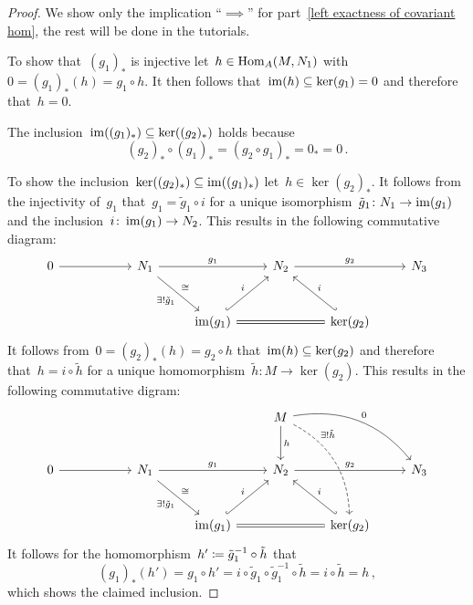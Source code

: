 \begin{proof}
  We show only the implication \enquote{$\implies$} for part~\ref*{left exactness of covariant hom}, the rest will be done in the tutorials.
  
  To show that~$(g_1)_*$ is injective let~$h \in \operatorname{Hom}_A(M,N_1)$ with~$0 = (g_1)_*(h) = g_1 \circ h$.
  It then follows that~$\operatorname{im}(h) \subseteq \ker(g_1) = 0$ and therefore that~$h = 0$.
  
  The inclusion~$\operatorname{im}((g_1)_*) \subseteq \ker((g_2)_*)$ holds because
  \[
      (g_2)_* \circ (g_1)_*
    = (g_2 \circ g_1)_*
    = 0_*
    = 0 \,.
  \]
  
  To show the inclusion~$\ker((g_2)_*) \subseteq \operatorname{im}((g_1)_*)$ let~$h \in \ker(g_2)_*$.
  It follows from the injectivity of~$g_1$ that~$g_1 = \tilde{g}_1 \circ i$ for a unique isomorphism~$\tilde{g}_1 \colon N_1 \to \operatorname{im}(g_1)$ and the inclusion~$i \colon \operatorname{im}(g_1) \to N_2$.
  This results in the following commutative diagram:
  \[
    \begin{tikzcd}[row sep = large]
        0
        \arrow{rr}
      & {}
      & N_1
        \arrow{rr}[above]{g_1}
        \arrow{dr}[below left]{\exists! \tilde{g}_1}[above right]{\cong}
      & {}
      & N_2
        \arrow{rr}[above]{g_2}
      & {}
      & N_3
      \\
        {}
      & {}
      & {}
      & \im(g_1)
        \arrow[hook]{ur}[above left]{i}
        \arrow[equal]{rr}
      & {}
      & \ker(g_2)
        \arrow[hook']{ul}[above right]{i}
      & {}
    \end{tikzcd}
  \]
  It follows from~$0 = (g_2)_*(h) = g_2 \circ h$ that~$\operatorname{im}(h) \subseteq \ker(g_2)$ and therefore that~$h = i \circ \tilde{h}$ for a unique homomorphism~$\tilde{h} \colon M \to \ker(g_2)$.
  This results in the following commutative digram:
    \[
    \begin{tikzcd}[row sep = large]
        {}
      & {}
      & {}
      & {}
      & M
        \arrow[bend left]{rrd}{0}
        \arrow{d}{h}
        \arrow[bend left, dashed]{ddr}[near start, above right]{\exists! \tilde{h}}
      & {}
      & {}
      \\
        0
        \arrow{rr}
      & {}
      & N_1
        \arrow{rr}[above]{g_1}
        \arrow{dr}[below left]{\exists! \tilde{g}_1}[above right]{\cong}
      & {}
      & N_2
        \arrow{rr}[above]{g_2}
      & {}
      & N_3
      \\
        {}
      & {}
      & {}
      & \im(g_1)
        \arrow[hook]{ur}[above left]{i}
        \arrow[equal]{rr}
      & {}
      & \ker(g_2)
        \arrow[hook']{ul}[above right]{i}
      & {}
    \end{tikzcd}
  \]
  It follows for the homomorphism~$h' \coloneqq \tilde{g}_1^{-1} \circ \tilde{h}$ that
  \[
      (g_1)_*(h')
    = g_1 \circ h'
    = i \circ \tilde{g}_1 \circ \tilde{g}_1^{-1} \circ \tilde{h}
    = i \circ \tilde{h}
    = h \,,
  \]
  which shows the claimed inclusion.
\end{proof}




